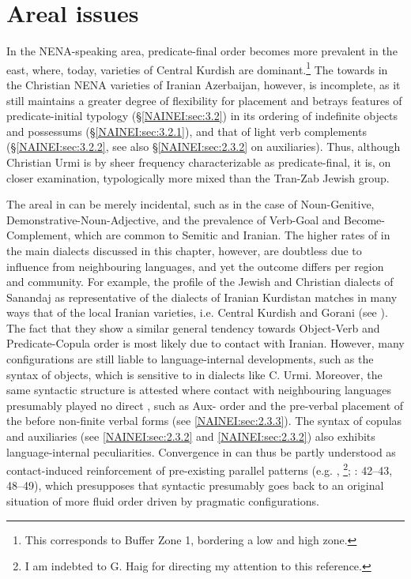 \documentclass[output=paper,colorlinks,citecolor=brown,draftmode]{langscibook}
\begin{document}
\section{Areal issues}
In the NENA-speaking area, predicate-final order becomes more prevalent in the east, where, today, varieties of Central Kurdish are dominant.\footnote{This corresponds to  Buffer Zone 1, bordering a low  and high  zone.} The  towards  in the Christian NENA varieties of Iranian Azerbaijan, however, is incomplete, as it still maintains a greater degree of flexibility for  placement and betrays features of predicate-initial typology (§\ref{NAINEI:sec:3.2}) in its ordering of indefinite objects and possessums (§\ref{NAINEI:sec:3.2.1}), and that of light verb complements (§\ref{NAINEI:sec:3.2.2}, see also §\ref{NAINEI:sec:2.3.2} on auxiliaries). Thus, although Christian Urmi is by sheer frequency characterizable as predicate-final, it is, on closer examination, typologically more mixed than the Tran-Zab Jewish group.

The areal  in  can be merely incidental, such as in the case of Noun-Genitive, Demonstrative-Noun-Adjective, and the prevalence of Verb-Goal and Become-Complement, which are common to Semitic and Iranian. The higher rates of  in the main dialects discussed in this chapter, however, are doubtless due to influence from neighbouring  languages, and yet the outcome differs per region and community. For example, the  profile of the Jewish and Christian dialects of Sanandaj as representative of the dialects of Iranian Kurdistan matches in many ways that of the local Iranian varieties, i.e. Central Kurdish and Gorani (see ). The fact that they show a similar general tendency towards Object-Verb and Predicate-Copula order is most likely due to contact with Iranian. However, many configurations are still liable to language-internal developments, such as the syntax of objects, which is sensitive to  in dialects like C. Urmi. Moreover, the same syntactic structure is attested where contact with neighbouring  languages presumably played no direct , such as Aux- order and the pre-verbal placement of the  before non-finite verbal forms (see \ref{NAINEI:sec:2.3.3}). The syntax of copulas and auxiliaries (see \ref{NAINEI:sec:2.3.2} and \ref{NAINEI:sec:2.3.2}) also exhibits language-internal peculiarities. Convergence in  can thus be partly understood as contact-induced reinforcement of pre-existing parallel patterns (e.g. \citealt{Silva-Corvalan1994ContactChange}, \citeyear{Silva-Corvalan2008Limits}\footnote{I am indebted to G. Haig for directing my attention to this reference.}; \citealt{Heine2008contact}: 42–43, 48–49), which presupposes that syntactic  presumably goes back to an original situation of more fluid order driven by pragmatic configurations.
\end{document}
